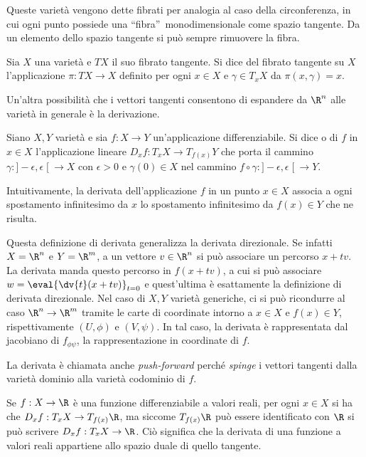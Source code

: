 Queste varietà vengono dette fibrati per analogia al caso della circonferenza, in cui ogni punto possiede una \textquotedblleft fibra\textquotedblright\ monodimensionale come spazio tangente. Da un elemento dello spazio tangente si può sempre rimuovere la fibra.
\begin{definition}
  Sia $X$ una varietà e $T X$ il suo fibrato tangente. Si dice  del fibrato tangente su $X$ l'applicazione $\pi: TX \to X$ definito per ogni $x \in X$ e $\gamma \in T_x X$ da $\pi(x,\gamma) = x$.
\end{definition}

Un'altra possibilità che i vettori tangenti consentono di espandere da $\R^{n}$ alle varietà in generale è la derivazione.
\begin{definition}
  Siano $X,Y$ varietà e sia $f:X\to Y$ un'applicazione differenziabile. Si dice  o  di $f$ in $x \in X$ l'applicazione lineare $D_x f:T_x X \to T_{f(x)}Y$ che porta il cammino $\gamma: ]-\epsilon, \epsilon\;[\ \to X$ con $\epsilon>0$ e $\gamma(0) \in X$ nel cammino $f \circ \gamma:]-\epsilon, \epsilon\;[\ \to Y$.
\end{definition}
\begin{remark}
  Intuitivamente, la derivata dell'applicazione $f$ in un punto $x \in X$ associa a ogni spostamento infinitesimo da $x$ lo spostamento infinitesimo da $f(x) \in Y$ che ne risulta.
\end{remark}
\begin{remark}
  Questa definizione di derivata generalizza la derivata direzionale. Se infatti $X = \R^{n}$ e $Y = \R^{m}$, a un vettore $v \in \R^{n}$ si può associare un percorso $x + tv$. La derivata manda questo percorso in $f(x+tv)$, a cui si può associare $w = \eval{\dv{t}(x+tv)}_{t=0}$ e quest'ultima è esattamente la definizione di derivata direzionale. Nel caso di $X,Y$ varietà generiche, ci si può ricondurre al caso $\R^{n} \to \R^{m}$ tramite le carte di coordinate intorno a $x \in X$ e $f(x)\in Y$, rispettivamente $(U, \phi)$ e $(V,\psi)$. In tal caso, la derivata è rappresentata dal jacobiano di $f_{\phi \psi}$, la rappresentazione in coordinate di $f$.
\end{remark}
\begin{remark}
  La derivata è chiamata anche \emph{push-forward} perché \emph{spinge} i vettori tangenti dalla varietà dominio alla varietà codominio di $f$. 
\end{remark}

Se $f:X \to \R$ è una funzione differenziabile a valori reali, per ogni $x \in X$ si ha che $D_x f: T_x X \to T_{f(x)}\R$, ma siccome $T_{f(x)}\R$ può essere identificato con $\R$ si può scrivere $D_x f: T_x X \to \R$. Ciò significa che la derivata di una funzione a valori reali appartiene allo spazio duale di quello tangente.

